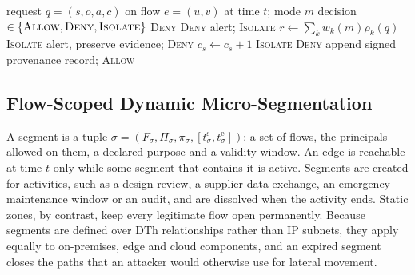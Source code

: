 \documentclass[journal]{IEEEtran}
\newcommand{\ztas}{ZTAS-DTh}
\begin{document}
\begin{algorithm}[!t]
\caption{Policy decision and enforcement at a \ztas{} PEP}
\label{alg:pdp}
\begin{algorithmic}[1]
\Require request $q=(s,o,a,c)$ on flow $e=(u,v)$ at time $t$; mode $m$
\Ensure decision $\in\{\textsc{Allow},\textsc{Deny},\textsc{Isolate}\}$
 \State \Return \textsc{Deny}
\EndIf
{} \State \Return \textsc{Deny}
\EndIf
{} \State alert; \Return \textsc{Isolate}
\EndIf
\State $r\gets\sum_k w_k(m)\rho_k(q)$ 
 \State \Return \textsc{Isolate} 
 \State alert, preserve evidence; \Return \textsc{Deny}
   \State $c_s\gets c_s+1$
      \Return \textsc{Isolate} \EndIf
     \State \Return \textsc{Deny}
  \EndIf
\EndIf
\State append signed provenance record; \Return \textsc{Allow}
\end{algorithmic}
\end{algorithm}

\subsection{Flow-Scoped Dynamic Micro-Segmentation}
\label{sec:arch-seg}
A segment is a tuple $\sigma=(F_\sigma,\Pi_\sigma,\pi_\sigma,[t^{\mathrm{s}}_\sigma,t^{\mathrm{e}}_\sigma])$: a set of flows, the principals allowed on them, a declared purpose and a validity window. An edge is reachable at time $t$ only while some segment that contains it is active. Segments are created for activities, such as a design review, a supplier data exchange, an emergency maintenance window or an audit, and are dissolved when the activity ends. Static zones, by contrast, keep every legitimate flow open permanently. Because segments are defined over DTh relationships rather than IP subnets, they apply equally to on-premises, edge and cloud components, and an expired segment closes the paths that an attacker would otherwise use for lateral movement.
\end{document}
